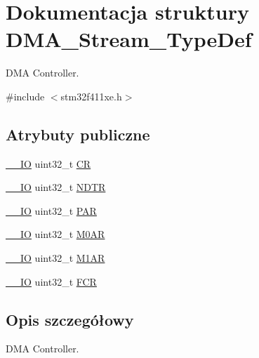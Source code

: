 \hypertarget{struct_d_m_a___stream___type_def}{}\section{Dokumentacja struktury D\+M\+A\+\_\+\+Stream\+\_\+\+Type\+Def}
\label{struct_d_m_a___stream___type_def}


D\+MA Controller.  




{\ttfamily \#include $<$stm32f411xe.\+h$>$}

\subsection*{Atrybuty publiczne}
\begin{DoxyCompactItemize}
\item 
\hyperlink{core__sc300_8h_aec43007d9998a0a0e01faede4133d6be}{\+\_\+\+\_\+\+IO} uint32\+\_\+t \hyperlink{struct_d_m_a___stream___type_def_af893adc5e821b15d813237b2bfe4378b}{CR}
\item 
\hyperlink{core__sc300_8h_aec43007d9998a0a0e01faede4133d6be}{\+\_\+\+\_\+\+IO} uint32\+\_\+t \hyperlink{struct_d_m_a___stream___type_def_a2cc2a52628182f9e79ab1e49bb78a1eb}{N\+D\+TR}
\item 
\hyperlink{core__sc300_8h_aec43007d9998a0a0e01faede4133d6be}{\+\_\+\+\_\+\+IO} uint32\+\_\+t \hyperlink{struct_d_m_a___stream___type_def_adbeac1d47cb85ab52dac71d520273947}{P\+AR}
\item 
\hyperlink{core__sc300_8h_aec43007d9998a0a0e01faede4133d6be}{\+\_\+\+\_\+\+IO} uint32\+\_\+t \hyperlink{struct_d_m_a___stream___type_def_a965da718db7d0303bff185d367d96fd6}{M0\+AR}
\item 
\hyperlink{core__sc300_8h_aec43007d9998a0a0e01faede4133d6be}{\+\_\+\+\_\+\+IO} uint32\+\_\+t \hyperlink{struct_d_m_a___stream___type_def_a142ca5a1145ba9cf4cfa557655af1c13}{M1\+AR}
\item 
\hyperlink{core__sc300_8h_aec43007d9998a0a0e01faede4133d6be}{\+\_\+\+\_\+\+IO} uint32\+\_\+t \hyperlink{struct_d_m_a___stream___type_def_aad3d78ab35e7af48951be5be53392f9f}{F\+CR}
\end{DoxyCompactItemize}


\subsection{Opis szczegółowy}
D\+MA Controller. 

